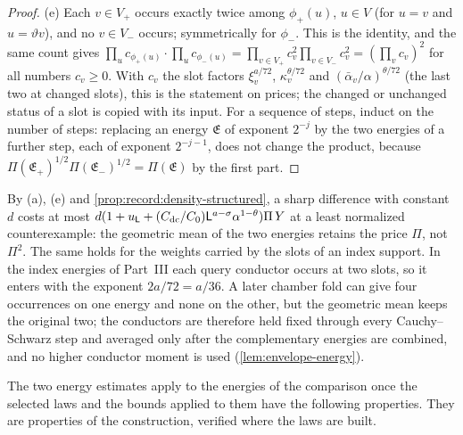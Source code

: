 \begin{proof}
(e) Each $v\in V_+$ occurs exactly twice among $\phi_+(u)$, $u\in V$ (for
$u=v$ and $u=\vartheta v$), and no $v\in V_-$ occurs; symmetrically for
$\phi_-$. This is the identity, and the same count gives
$\prod_uc_{\phi_+(u)}\cdot\prod_uc_{\phi_-(u)}=\prod_{v\in V_+}c_v^2
\prod_{v\in V_-}c_v^2=(\prod_vc_v)^2$ for all numbers $c_v\ge0$. With $c_v$
the slot factors $\xi_v^{a/72}$, $\kappa_v^{\theta/72}$ and
$(\bar\alpha_v/\alpha)^{\theta/72}$ (the last two at changed slots), this is
the statement on prices; the changed or unchanged status of a slot is copied
with its input. For a sequence of
steps, induct on the number of steps: replacing an energy $\mathfrak E$ of
exponent $2^{-j}$ by the two energies of a further step, each of exponent
$2^{-j-1}$, does not change the product, because
$\Pi(\mathfrak E_+)^{1/2}\Pi(\mathfrak E_-)^{1/2}=\Pi(\mathfrak E)$ by the
first part.
\end{proof}

By (a), (e) and \cref{prop:record:density-structured}, a sharp difference
with constant $d$ costs at most
$d(1+u_\mathsf L+(C_{\rm dc}/C_0)\mathsf L^{a-\sigma}\alpha^{1-\theta})\Pi\,Y$ at a least
normalized counterexample: the geometric mean of the two energies retains the
price $\Pi$, not $\Pi^2$. The same holds for the weights carried by the slots
of an index support. In the index energies of Part~III each query conductor
occurs at two slots, so it enters with the exponent $2a/72=a/36$. A later
chamber fold can give four occurrences on one energy and none on the other,
but the geometric mean keeps the original two; the conductors are therefore
held fixed through every Cauchy--Schwarz step and averaged only after the
complementary energies are combined, and no higher conductor moment is used
(\cref{lem:envelope-energy}).

The two energy estimates apply to the energies of the comparison once the
selected laws and the bounds applied to them have the following properties.
They are properties of the construction, verified where the laws are built.

